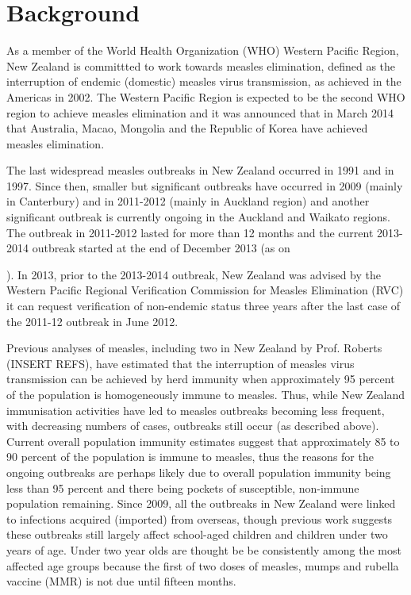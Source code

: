 \documentclass{article}
\begin{document}
\section{Background}

As a member of the World Health Organization (WHO) Western Pacific Region, New Zealand is committted to work towards measles elimination, defined as the interruption of endemic (domestic) measles virus transmission, as achieved in the Americas in 2002. The Western Pacific Region is expected to be the second WHO region to  achieve measles elimination and it was announced that in March 2014 that Australia, Macao, Mongolia and the Republic of Korea have achieved measles elimination.

The last widespread measles outbreaks in New Zealand occurred in 1991 and in 1997. Since then, smaller but significant outbreaks have occurred in 2009 (mainly in Canterbury) and in 2011-2012 (mainly in Auckland region) and another significant outbreak is currently ongoing in the Auckland and Waikato regions. The outbreak in 2011-2012 lasted for more than 12 months and the current 2013-2014 outbreak started at the end of December 2013 (as on \date{\today}). In 2013, prior to the 2013-2014 outbreak, New Zealand was advised by the Western Pacific Regional Verification Commission for Measles Elimination (RVC) it can request verification of non-endemic status three years after the last case of the 2011-12 outbreak in June 2012.

Previous analyses of measles, including two in New Zealand by Prof. Roberts (INSERT REFS), have estimated that the interruption of measles virus transmission can be achieved by herd immunity when approximately 95 percent of the population is homogeneously immune to measles. Thus, while New Zealand immunisation activities have led to measles outbreaks becoming less frequent, with decreasing numbers of cases, outbreaks still occur (as described above). Current overall population immunity estimates suggest that approximately 85 to 90 percent of the population is immune to measles, thus the reasons for the ongoing outbreaks are perhaps likely due to overall population immunity being less than 95 percent and there being pockets of susceptible, non-immune population remaining. Since 2009, all the outbreaks in New Zealand were linked to infections acquired (imported) from overseas, though previous work suggests these outbreaks still largely affect school-aged children and children under two years of age. Under two year olds are thought be be consistently among the most affected age groups because the first of two doses of measles, mumps and rubella vaccine (MMR) is not due until fifteen months.
\end{document}
